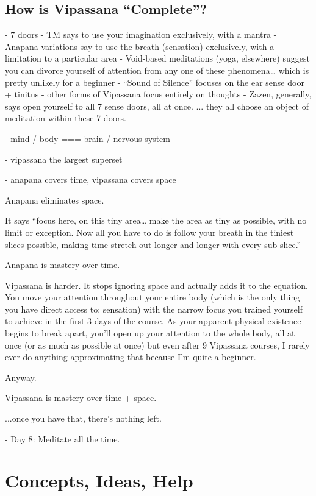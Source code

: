 \documentclass[a4paper, amsfonts, amssymb, amsmath, reprint, showkeys, nofootinbib, twoside]{revtex4-1}
\begin{document}
\subsection{How is Vipassana ``Complete''?}

- 7 doors
- TM says to use your imagination exclusively, with a mantra
- Anapana variations say to use the breath (sensation) exclusively, with a limitation to a particular area
- Void-based meditations (yoga, elsewhere) suggest you can divorce yourself of attention from any one of these phenomena… which is pretty unlikely for a beginner
- “Sound of Silence” focuses on the ear sense door + tinitus
- other forms of Vipassana focus entirely on thoughts
- Zazen, generally, says open yourself to all 7 sense doors, all at once.
... they all choose an object of meditation within these 7 doors.

- mind / body === brain / nervous system

- vipassana the largest superset

- anapana covers time, vipassana covers space

Anapana eliminates space.

It says “focus here, on this tiny area… make the area as tiny as possible, with no
limit or exception. Now all you have to do is follow your breath in the tiniest
slices possible, making time stretch out longer and longer with every sub-slice.”

Anapana is mastery over time.

Vipassana is harder. It stops ignoring space and actually adds it to the equation. You move your attention throughout your entire body (which is the only thing you have direct access to: sensation) with the narrow focus you trained yourself to achieve in the first 3 days of the course. As your apparent physical existence begins to break apart, you’ll open up your attention to the whole body, all at once (or as much as possible at once) but even after 9 Vipassana courses, I rarely ever do anything approximating that because I’m quite a beginner. 🙂

Anyway.

Vipassana is mastery over time + space.

...once you have that, there’s nothing left.

- Day 8: Meditate all the time.


\section{Concepts, Ideas, Help}
\end{document}

